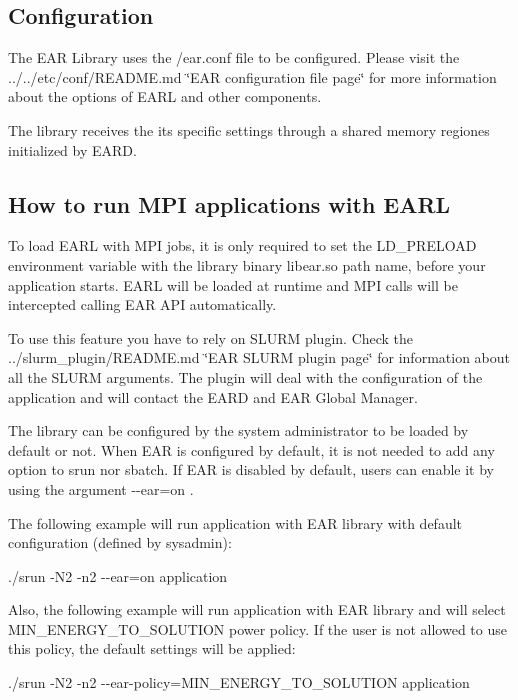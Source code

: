 \subsection*{Configuration }

The E\+AR Library uses the {\ttfamily /ear.conf} file to be configured. Please visit the ../../etc/conf/\+R\+E\+A\+D\+ME.md \char`\"{}\+E\+A\+R configuration file page\char`\"{} for more information about the options of E\+A\+RL and other components.

The library receives the its specific settings through a shared memory regiones initialized by E\+A\+RD.

\subsection*{How to run M\+PI applications with E\+A\+RL }

To load E\+A\+RL with M\+PI jobs, it is only required to set the {\ttfamily L\+D\+\_\+\+P\+R\+E\+L\+O\+AD} environment variable with the library binary \textquotesingle{}libear.\+so\textquotesingle{} path name, before your application starts. E\+A\+RL will be loaded at runtime and M\+PI calls will be intercepted calling E\+AR A\+PI automatically.

To use this feature you have to rely on S\+L\+U\+RM plugin. Check the ../slurm\+\_\+plugin/\+R\+E\+A\+D\+ME.md \char`\"{}\+E\+A\+R S\+L\+U\+R\+M plugin page\char`\"{} for information about all the S\+L\+U\+RM arguments. The plugin will deal with the configuration of the application and will contact the E\+A\+RD and E\+AR Global Manager.

The library can be configured by the system administrator to be loaded by default or not. When E\+AR is configured by default, it is not needed to add any option to {\ttfamily srun} nor {\ttfamily sbatch}. If E\+AR is disabled by default, users can enable it by using the argument {\ttfamily -\/-\/ear=on} .

The following example will run application with E\+AR library with default configuration (defined by sysadmin)\+:

{\ttfamily ./srun -\/\+N2 -\/n2 -\/-\/ear=on application}

Also, the following example will run application with E\+AR library and will select M\+I\+N\+\_\+\+E\+N\+E\+R\+G\+Y\+\_\+\+T\+O\+\_\+\+S\+O\+L\+U\+T\+I\+ON power policy. If the user is not allowed to use this policy, the default settings will be applied\+:

{\ttfamily ./srun -\/\+N2 -\/n2 -\/-\/ear-\/policy=M\+I\+N\+\_\+\+E\+N\+E\+R\+G\+Y\+\_\+\+T\+O\+\_\+\+S\+O\+L\+U\+T\+I\+ON application}

